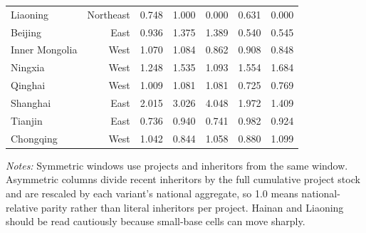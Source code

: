 \begin{table}[!htbp]
{\begin{tabular}{lrrrrrr}
Liaoning & Northeast & 0.748 & 1.000 & 0.000 & 0.631 & 0.000 \\
Beijing & East & 0.936 & 1.375 & 1.389 & 0.540 & 0.545 \\
Inner Mongolia & West & 1.070 & 1.084 & 0.862 & 0.908 & 0.848 \\
Ningxia & West & 1.248 & 1.535 & 1.093 & 1.554 & 1.684 \\
Qinghai & West & 1.009 & 1.081 & 1.081 & 0.725 & 0.769 \\
Shanghai & East & 2.015 & 3.026 & 4.048 & 1.972 & 1.409 \\
Tianjin & East & 0.736 & 0.940 & 0.741 & 0.982 & 0.924 \\
Chongqing & West & 1.042 & 0.844 & 1.058 & 0.880 & 1.099 \\
\bottomrule
\end{tabular}
}
\begin{minipage}{0.96\textwidth}
\footnotesize \textit{Notes:} Symmetric windows use projects and inheritors from the same window. Asymmetric columns divide recent inheritors by the full cumulative project stock and are rescaled by each variant's national aggregate, so 1.0 means national-relative parity rather than literal inheritors per project. Hainan and Liaoning should be read cautiously because small-base cells can move sharply.
\end{minipage}
\end{table}
